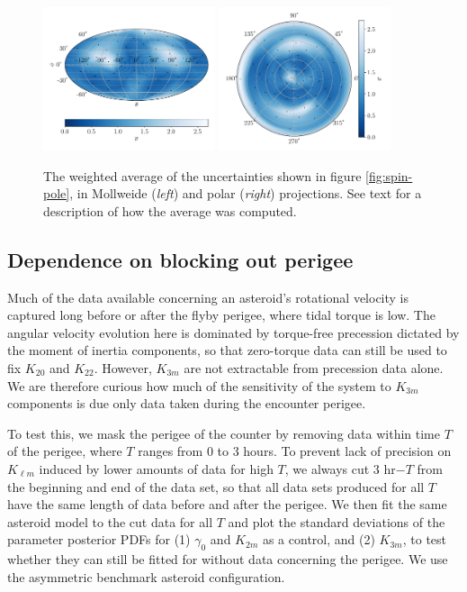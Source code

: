 \documentclass{aastex631}
\begin{document}
\begin{figure}
  \centering
  \includegraphics[width=0.45\textwidth]{spin-pole-avg-mollweide.pdf}
  \includegraphics[width=0.45\textwidth]{spin-pole-avg-polar.pdf}
  \caption{The weighted average of the uncertainties shown in figure \ref{fig:spin-pole}, in Mollweide (\textit{left}) and polar (\textit{right}) projections. See text for a description of how the average was computed.}
  \label{fig:spin-pole-avg}
\end{figure}


\subsection{Dependence on blocking out perigee}
\label{sec:block-perigee}
Much of the data available concerning an asteroid's rotational velocity is captured long before or after the flyby perigee, where tidal torque is low. The angular velocity evolution here is dominated by torque-free precession dictated by the moment of inertia components, so that zero-torque data can still be used to fix $K_{20}$ and $K_{22}$. However, $K_{3m}$ are not extractable from precession data alone. We are therefore curious how much of the sensitivity of the system to $K_{3m}$ components is due only data taken during the encounter perigee.

To test this, we mask the perigee of the counter by removing data within time $T$ of the perigee, where $T$ ranges from 0 to 3 hours. To prevent lack of precision on $K_{\ell m}$ induced by lower amounts of data for high $T$, we always cut 3 hr$-T$ from the beginning and end of the data set, so that all data sets produced for all $T$ have the same length of data before and after the perigee. We then fit the same asteroid model to the cut data for all $T$ and plot the standard deviations of the parameter posterior PDFs for (1) $\gamma_0$ and $K_{2m}$ as a control, and (2) $K_{3m}$, to test whether they can still be fitted for without data concerning the perigee. We use the asymmetric benchmark asteroid configuration.
\end{document}
